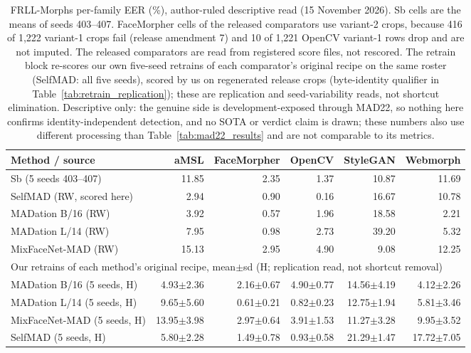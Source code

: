     \begin{table}[t]
    \centering\small
    \setlength{\tabcolsep}{2.4pt}
    \caption{FRLL-Morphs per-family EER (\%), author-ruled descriptive read (15 November 2026). Sb cells are the means of seeds 403--407. FaceMorpher cells of the released comparators use variant-2 crops, because 416 of 1,222 variant-1 crops fail (release amendment 7) and 10 of 1,221 OpenCV variant-1 rows drop and are not imputed. The released comparators are read from registered score files, not rescored. The retrain block re-scores our own five-seed retrains of each comparator's original recipe on the same roster (SelfMAD: all five seeds), scored by us on regenerated release crops (byte-identity qualifier in Table~\ref{tab:retrain_replication}); these are replication and seed-variability reads, not shortcut elimination. Descriptive only: the genuine side is development-exposed through MAD22, so nothing here confirms identity-independent detection, and no SOTA or verdict claim is drawn; these numbers also use different processing than Table~\ref{tab:mad22_results} and are not comparable to its metrics.}
    \label{tab:frll_results}
    \begin{tabular}{lrrrrr}
    \toprule
    Method / source & aMSL & FaceMorpher & OpenCV & StyleGAN & Webmorph \\
    \midrule
    Sb (5 seeds 403--407) & 11.85 & 2.35 & 1.37 & 10.87 & 11.69 \\
    SelfMAD (RW, scored here) & 2.94 & 0.90 & 0.16 & 16.67 & 10.78 \\
    MADation B/16 (RW) & 3.92 & 0.57 & 1.96 & 18.58 & 2.21 \\
    MADation L/14 (RW) & 7.95 & 0.98 & 2.73 & 39.20 & 5.32 \\
    MixFaceNet-MAD (RW) & 15.13 & 2.95 & 4.90 & 9.08 & 12.25 \\
    \midrule
    \multicolumn{6}{l}{Our retrains of each method's original recipe, mean$\pm$sd (H; replication read, not shortcut removal)} \\
    \quad MADation B/16 (5 seeds, H) & 4.93$\pm$2.36 & 2.16$\pm$0.67 & 4.90$\pm$0.77 & 14.56$\pm$4.19 & 4.12$\pm$2.26 \\
    \quad MADation L/14 (5 seeds, H) & 9.65$\pm$5.60 & 0.61$\pm$0.21 & 0.82$\pm$0.23 & 12.75$\pm$1.94 & 5.81$\pm$3.46 \\
    \quad MixFaceNet-MAD (5 seeds, H) & 13.95$\pm$3.98 & 2.97$\pm$0.64 & 3.91$\pm$1.53 & 11.27$\pm$3.28 & 9.95$\pm$3.52 \\
    \quad SelfMAD (5 seeds, H) & 5.80$\pm$2.28 & 1.49$\pm$0.78 & 0.93$\pm$0.58 & 21.29$\pm$1.47 & 17.72$\pm$7.05 \\

\end{tabular}
\end{table}
